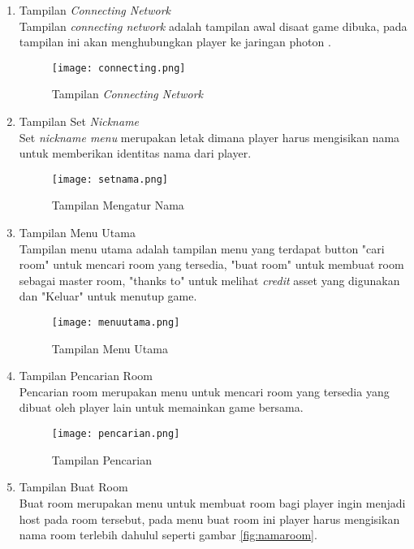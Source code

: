 \begin{enumerate}
    \item Tampilan \textit{Connecting Network} \\
    Tampilan \textit{connecting network} adalah tampilan awal disaat game dibuka, pada tampilan ini akan menghubungkan player ke jaringan photon .
    \begin{figure}[h]
        \centering
        \texttt{[image: connecting.png]}
        \caption{Tampilan \textit{Connecting Network}}
        \label{fig:connecting}
    \end{figure}
    \item Tampilan Set \textit{Nickname} \\
    Set \textit{nickname menu} merupakan letak dimana player harus mengisikan nama untuk memberikan identitas nama dari player. 
    \newpage
    \begin{figure}[h]
        \centering
        \texttt{[image: setnama.png]}
        \caption{Tampilan Mengatur Nama}
        \label{fig:setnama}
    \end{figure}
    \item Tampilan Menu Utama\\
    Tampilan menu utama adalah tampilan menu yang terdapat button "cari room" untuk mencari room yang tersedia, "buat room" untuk membuat room sebagai master room,  "thanks to" untuk melihat \textit{credit} asset yang digunakan dan "Keluar" untuk menutup game.
    \begin{figure}[h]
        \centering
        \texttt{[image: menuutama.png]}
        \caption{Tampilan Menu Utama}
        \label{fig:menutama}
    \end{figure}
    \item Tampilan Pencarian Room\\
    Pencarian room merupakan menu untuk mencari room yang tersedia yang dibuat oleh player lain untuk memainkan game bersama.
    \newpage
    \begin{figure}[h]
        \centering
        \texttt{[image: pencarian.png]}
        \caption{Tampilan Pencarian}
        \label{fig:pencarian}
    \end{figure}
    \item Tampilan Buat Room \\
    Buat room merupakan menu untuk membuat room bagi player ingin menjadi host pada room tersebut, pada menu buat room ini player harus mengisikan nama room terlebih dahulul seperti gambar \ref{fig:namaroom}.
    \begin{figure}[h]

\end{figure}
\end{enumerate}
